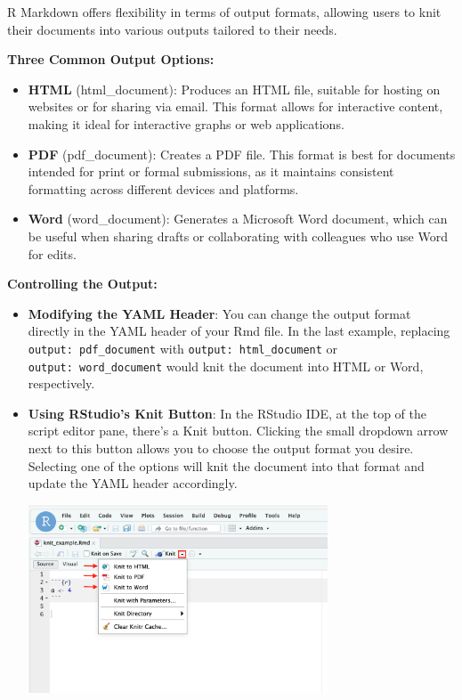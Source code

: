 \documentclass[
]{book}
\begin{document}
R Markdown offers flexibility in terms of output formats, allowing users to knit their documents into various outputs tailored to their needs.

\textbf{Three Common Output Options:}

\begin{itemize}
\item
  \textbf{HTML} (html\_document): Produces an HTML file, suitable for hosting on websites or for sharing via email. This format allows for interactive content, making it ideal for interactive graphs or web applications.
\item
  \textbf{PDF} (pdf\_document): Creates a PDF file. This format is best for documents intended for print or formal submissions, as it maintains consistent formatting across different devices and platforms.
\item
  \textbf{Word} (word\_document): Generates a Microsoft Word document, which can be useful when sharing drafts or collaborating with colleagues who use Word for edits.
\end{itemize}

\textbf{Controlling the Output:}

\begin{itemize}
\item
  \textbf{Modifying the YAML Header}: You can change the output format directly in the YAML header of your Rmd file. In the last example, replacing \texttt{output:\ pdf\_document} with \texttt{output:\ html\_document} or \texttt{output:\ word\_document} would knit the document into HTML or Word, respectively.
\item
  \textbf{Using RStudio's Knit Button}: In the RStudio IDE, at the top of the script editor pane, there's a Knit button. Clicking the small dropdown arrow next to this button allows you to choose the output format you desire. Selecting one of the options will knit the document into that format and update the YAML header accordingly.

  \includegraphics[width=0.7\textwidth,height=\textheight]{images/knit_options.PNG}
\end{itemize}
\end{document}
